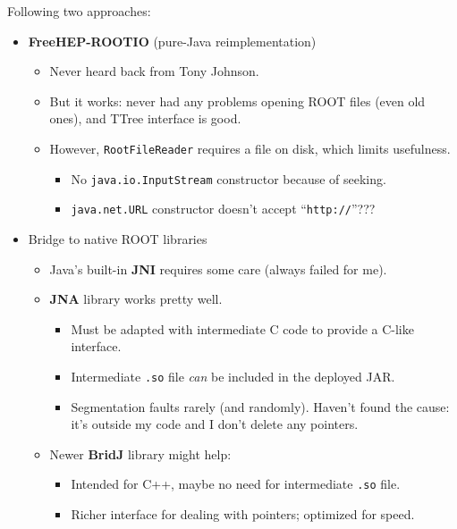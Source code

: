 \documentclass{beamer}
\begin{document}
\begin{frame}{Following two approaches:}
\begin{itemize}
\item<1-> {\bf FreeHEP-ROOTIO} (pure-Java reimplementation)
\begin{itemize}
\item Never heard back from Tony Johnson.
\item But it works: never had any problems opening ROOT files (even old ones), and TTree interface is good.
\item However, {\tt RootFileReader} requires a file on disk, which limits usefulness.
\begin{itemize}
\item No {\tt java.io.InputStream} constructor because of seeking.
\item {\tt java.net.URL} constructor doesn't accept ``{\tt http://}''???
\end{itemize}
\end{itemize}

\item<2> Bridge to native ROOT libraries
\begin{itemize}
\item Java's built-in {\bf JNI} requires some care (always failed for me).
\item {\bf JNA} library works pretty well.
\begin{itemize}
\item Must be adapted with intermediate C code to provide a C-like interface.
\item Intermediate {\tt .so} file {\it can} be included in the deployed JAR.
\item Segmentation faults rarely (and randomly). Haven't found the cause: it's outside my code and I don't delete any pointers.
\end{itemize}
\item Newer {\bf BridJ} library might help:
\begin{itemize}
\item Intended for C++, maybe no need for intermediate {\tt .so} file.
\item Richer interface for dealing with pointers; optimized for speed.
\end{itemize}
\end{itemize}
\end{itemize}
\end{frame}
\end{document}
